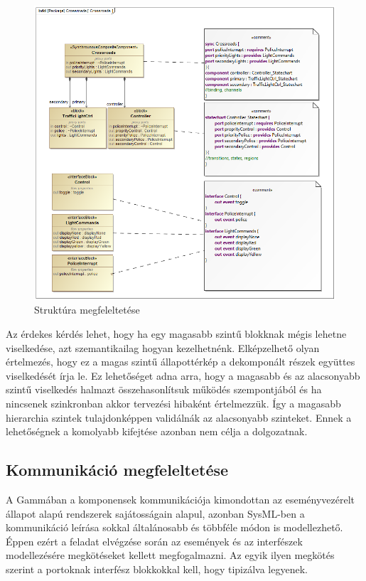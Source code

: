 \begin{figure}[!ht]
	\centering
	\includegraphics[width=140mm, keepaspectratio]{figures/contribution/md2g.png}
	\caption{Struktúra megfeleltetése}
	\label{fig:md2g}
\end{figure}

Az érdekes kérdés lehet, hogy ha egy magasabb szintű blokknak mégis lehetne viselkedése, azt szemantikailag hogyan kezelhetnénk. Elképzelhető olyan értelmezés, hogy ez a magas szintű állapottérkép a dekomponált részek együttes viselkedését írja le. Ez lehetőséget adna arra, hogy a magasabb és az alacsonyabb szintű viselkedés halmazt összehasonlítsuk működés szempontjából és ha nincsenek szinkronban akkor tervezési hibaként értelmezzük. Így a magasabb hierarchia szintek tulajdonképpen validálnák az alacsonyabb szinteket. Ennek a lehetőségnek a komolyabb kifejtése azonban nem célja a dolgozatnak.

\subsection{Kommunikáció megfeleltetése}

A Gammában a komponensek kommunikációja kimondottan az eseményvezérelt állapot alapú rendszerek sajátosságain alapul, azonban SysML-ben a kommunikáció leírása sokkal általánosabb és többféle módon is modellezhető. Éppen ezért a feladat elvégzése során az események és az interfészek modellezésére megkötéseket kellett megfogalmazni.
Az egyik ilyen megkötés szerint a portoknak interfész blokkokkal kell, hogy tipizálva legyenek.

